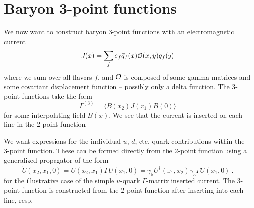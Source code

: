 \documentclass[12pt]{article}
\begin{document}
\newpage

\section{Baryon 3-point functions}

We now want to construct baryon 3-point functions with an electromagnetic
current
\[
J(x) = \sum_f e_f \bar{q}_f(x){\cal O}(x,y) q_f(y)
\]
where we sum over all flavors $f$, and $\cal O$ is composed of
some gamma matrices and some covariant displacement function -- 
possibly only a delta function. The 3-point functions take the form
%
\[
\Gamma^{(3)} = \langle B(x_2) J(x_1) \bar{B}(0) \rangle
\]
for some interpolating field $B(x)$. We see that the current is inserted on
each line in the 2-point function. 

We want expressions for the individual $u$, $d$, etc. quark contributions 
within the 3-point function. These can be formed directly from the 2-point
function using a generalized propagator of the form
\[
\widetilde{U}(x_2,x_1,0) = U(x_2,x_1) \Gamma U(x_1,0) 
   = \gamma_5 U^\dag(x_1,x_2)\gamma_5 \Gamma U(x_1,0)\ .
\]
for the illustrative case of the simple $u$-quark $\Gamma$-matrix
inserted current. The 3-point function is constructed from the 2-point
function after inserting into each line, resp. 
\end{document}
